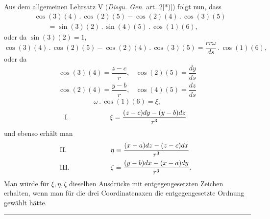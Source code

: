 Aus dem allgemeinen Lehrsatz V (\textit{Disqu. Gen.} art. 2[*)]\begingroup\renewcommand{\thefootnote}{}\footnotetext{[*) Werke IV, S. 220.]}\endgroup) folgt nun, dass
\[
\begin{aligned}
&\cos(3)(4)\mathbin{.}\cos(2)(5)-\cos(2)(4)\mathbin{.}\cos(3)(5)\\
&\qquad=\sin(3)(2)\mathbin{.}\sin(4)(5)\mathbin{.}\cos(1)(6),
\end{aligned}
\]
\noindent oder da $\sin(3)(2)=1$,
\[
\cos(3)(4)\mathbin{.}\cos(2)(5)-\cos(2)(4)\mathbin{.}\cos(3)(5)=\frac{rr\omega}{ds}\mathbin{.}\cos(1)(6),
\]
\noindent oder da
\[
\begin{array}{ll}
\cos(3)(4)=\dfrac{z-c}{r},&\cos(2)(5)=\dfrac{dy}{ds}\\[5pt]
\cos(2)(4)=\dfrac{y-b}{r},&\cos(4)(5)=\dfrac{dz}{ds}
\end{array}
\]
\[
\omega\mathbin{.}\cos(1)(6)=\xi,
\]
\[
\begin{array}{@{}l@{\hspace{6em}}l}
\mathrm{I.}&\xi=\dfrac{(z-c)dy-(y-b)dz}{r^3}
\end{array}
\]
\noindent und ebenso erhält man
\[
\begin{array}{@{}l@{\hspace{6em}}l}
\mathrm{II.}&\eta=\dfrac{(x-a)dz-(z-c)dx}{r^3}\\[8pt]
\mathrm{III.}&\zeta=\dfrac{(y-b)dx-(x-a)dy}{r^3}.
\end{array}
\]
\noindent Man würde für $\xi,\eta,\zeta$ dieselben Ausdrücke mit entgegengesetzten Zeichen erhalten, wenn man für die drei Coordinatenaxen die entgegengesetzte Ordnung gewählt hätte.
\begin{center}\rule{.18\textwidth}{.35pt}\end{center}
\clearpage\endgroup
